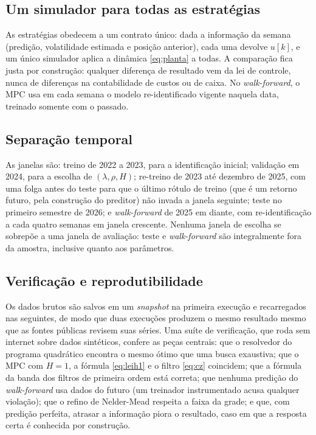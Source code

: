 \documentclass[conference]{IEEEtran}
\begin{document}
\subsection{Um simulador para todas as estratégias}

As estratégias obedecem a um contrato único: dada a informação da semana (predição, volatilidade estimada e posição anterior), cada uma devolve $u[k]$, e um único simulador aplica a dinâmica \eqref{eq:planta} a todas. A comparação fica justa por construção: qualquer diferença de resultado vem da lei de controle, nunca de diferenças na contabilidade de custos ou de caixa. No \emph{walk-forward}, o MPC usa em cada semana o modelo re-identificado vigente naquela data, treinado somente com o passado.

\subsection{Separação temporal}

As janelas são: treino de 2022 a 2023, para a identificação inicial; validação em 2024, para a escolha de $(\lambda,\rho,H)$; re-treino de 2023 até dezembro de 2025, com uma folga antes do teste para que o último rótulo de treino (que é um retorno futuro, pela construção do preditor) não invada a janela seguinte; teste no primeiro semestre de 2026; e \emph{walk-forward} de 2025 em diante, com re-identificação a cada quatro semanas em janela crescente. Nenhuma janela de escolha se sobrepõe a uma janela de avaliação: teste e \emph{walk-forward} são integralmente fora da amostra, inclusive quanto aos parâmetros.

\subsection{Verificação e reprodutibilidade}

Os dados brutos são salvos em um \emph{snapshot} na primeira execução e recarregados nas seguintes, de modo que duas execuções produzem o mesmo resultado mesmo que as fontes públicas revisem suas séries. Uma suíte de verificação, que roda sem internet sobre dados sintéticos, confere as peças centrais: que o resolvedor do programa quadrático encontra o mesmo ótimo que uma busca exaustiva; que o MPC com $H=1$, a fórmula \eqref{eq:leih1} e o filtro \eqref{eq:cz} coincidem; que a fórmula da banda dos filtros de primeira ordem está correta; que nenhuma predição do \emph{walk-forward} usa dados do futuro (um treinador instrumentado acusa qualquer violação); que o refino de Nelder-Mead respeita a faixa da grade; e que, com predição perfeita, atrasar a informação piora o resultado, caso em que a resposta certa é conhecida por construção.
\end{document}
